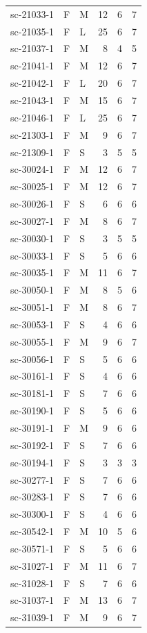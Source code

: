 \begin{longtable}{@{}p{}llrrr@{}}
sc-21033-1 & F & M & 12 & 6 & 7\\
sc-21035-1 & F & L & 25 & 6 & 7\\
sc-21037-1 & F & M & 8 & 4 & 5\\
sc-21041-1 & F & M & 12 & 6 & 7\\
sc-21042-1 & F & L & 20 & 6 & 7\\
sc-21043-1 & F & M & 15 & 6 & 7\\
sc-21046-1 & F & L & 25 & 6 & 7\\
sc-21303-1 & F & M & 9 & 6 & 7\\
sc-21309-1 & F & S & 3 & 5 & 5\\
sc-30024-1 & F & M & 12 & 6 & 7\\
sc-30025-1 & F & M & 12 & 6 & 7\\
sc-30026-1 & F & S & 6 & 6 & 6\\
sc-30027-1 & F & M & 8 & 6 & 7\\
sc-30030-1 & F & S & 3 & 5 & 5\\
sc-30033-1 & F & S & 5 & 6 & 6\\
sc-30035-1 & F & M & 11 & 6 & 7\\
sc-30050-1 & F & M & 8 & 5 & 6\\
sc-30051-1 & F & M & 8 & 6 & 7\\
sc-30053-1 & F & S & 4 & 6 & 6\\
sc-30055-1 & F & M & 9 & 6 & 7\\
sc-30056-1 & F & S & 5 & 6 & 6\\
sc-30161-1 & F & S & 4 & 6 & 6\\
sc-30181-1 & F & S & 7 & 6 & 6\\
sc-30190-1 & F & S & 5 & 6 & 6\\
sc-30191-1 & F & M & 9 & 6 & 6\\
sc-30192-1 & F & S & 7 & 6 & 6\\
sc-30194-1 & F & S & 3 & 3 & 3\\
sc-30277-1 & F & S & 7 & 6 & 6\\
sc-30283-1 & F & S & 7 & 6 & 6\\
sc-30300-1 & F & S & 4 & 6 & 6\\
sc-30542-1 & F & M & 10 & 5 & 6\\
sc-30571-1 & F & S & 5 & 6 & 6\\
sc-31027-1 & F & M & 11 & 6 & 7\\
sc-31028-1 & F & S & 7 & 6 & 6\\
sc-31037-1 & F & M & 13 & 6 & 7\\
sc-31039-1 & F & M & 9 & 6 & 7\\

\end{longtable}
